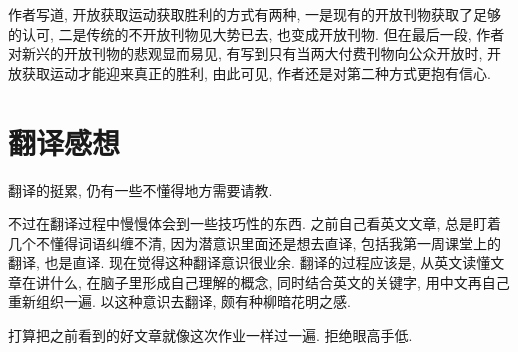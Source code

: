 \documentclass[a4paper, 12pt, UTF8]{article}
\begin{document}
作者写道, 开放获取运动获取胜利的方式有两种, 一是现有的开放刊物获取了足够的认可, 二是传统的不开放刊物见大势已去, 也变成开放刊物. 但在最后一段, 作者对新兴的开放刊物的悲观显而易见, 有写到只有当两大付费刊物向公众开放时, 开放获取运动才能迎来真正的胜利, 由此可见, 作者还是对第二种方式更抱有信心.

\section{翻译感想}
翻译的挺累, 仍有一些不懂得地方需要请教. 

不过在翻译过程中慢慢体会到一些技巧性的东西. 之前自己看英文文章, 总是盯着几个不懂得词语纠缠不清, 因为潜意识里面还是想去直译, 包括我第一周课堂上的翻译, 也是直译. 现在觉得这种翻译意识很业余. 翻译的过程应该是, 从英文读懂文章在讲什么, 在脑子里形成自己理解的概念, 同时结合英文的关键字, 用中文再自己重新组织一遍. 以这种意识去翻译, 颇有种柳暗花明之感.

打算把之前看到的好文章就像这次作业一样过一遍. 拒绝眼高手低.
\end{document}
